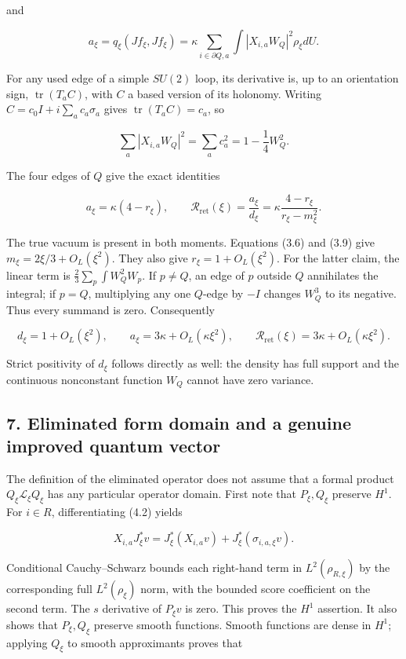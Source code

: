 and

\[
a_\xi=q_\xi(Jf_\xi,Jf_\xi)
=\kappa\sum_{i\in\partial Q,a}\int
 |X_{i,a}W_Q|^2\rho_\xi dU.
\tag{6.1}
\]

For any used edge of a simple \(SU(2)\) loop, its derivative is, up to
an orientation sign, \(\operatorname{tr}(T_aC)\), with \(C\) a based
version of its holonomy. Writing \(C=c_0I+i\sum_ac_a\sigma_a\) gives
\(\operatorname{tr}(T_aC)=c_a\), so

\[
\sum_a|X_{i,a}W_Q|^2=\sum_ac_a^2
=1-\frac14W_Q^2.
\]

The four edges of \(Q\) give the exact identities

\[
a_\xi=\kappa(4-r_\xi),\qquad
\mathcal R_{\mathrm{ret}}(\xi)=\frac{a_\xi}{d_\xi}
=\kappa\frac{4-r_\xi}{r_\xi-m_\xi^2}.
\tag{6.2}
\]

The true vacuum is present in both moments. Equations (3.6) and (3.9)
give \(m_\xi=2\xi/3+O_L(\xi^2)\). They also give \(r_\xi=1+O_L(\xi^2)\).
For the latter claim, the linear term is
\(\tfrac23\sum_p\int W_Q^2W_p\). If \(p\ne Q\), an edge of \(p\) outside
\(Q\) annihilates the integral; if \(p=Q\), multiplying any one
\(Q\)-edge by \(-I\) changes \(W_Q^3\) to its negative. Thus every
summand is zero. Consequently

\[
d_\xi=1+O_L(\xi^2),\qquad
a_\xi=3\kappa+O_L(\kappa\xi^2),\qquad
\mathcal R_{\mathrm{ret}}(\xi)=3\kappa+O_L(\kappa\xi^2).
\tag{6.3}
\]

Strict positivity of \(d_\xi\) follows directly as well: the density has
full support and the continuous nonconstant function \(W_Q\) cannot have
zero variance.

\subsection{7. Eliminated form domain and a genuine improved quantum
vector}\label{bulk-eliminated-form-domain-and-a-genuine-improved-quantum-vector}

The definition of the eliminated operator does not assume that a formal
product \(Q_\xi\mathscr L_\xi Q_\xi\) has any particular operator
domain. First note that \(P_\xi,Q_\xi\) preserve \(H^1\). For
\(i\in R\), differentiating (4.2) yields

\[
X_{i,a}J_\xi^*v
=J_\xi^*(X_{i,a}v)+J_\xi^*(\sigma_{i,a,\xi}v).
\tag{7.1}
\]

Conditional Cauchy--Schwarz bounds each right-hand term in
\(L^2(\rho_{R,\xi})\) by the corresponding full \(L^2(\rho_\xi)\) norm,
with the bounded score coefficient on the second term. The \(s\)
derivative of \(P_\xi v\) is zero. This proves the \(H^1\) assertion. It
also shows that \(P_\xi,Q_\xi\) preserve smooth functions. Smooth
functions are dense in \(H^1\); applying \(Q_\xi\) to smooth
approximants proves that

